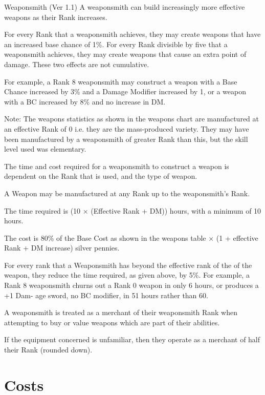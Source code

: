 \begin{Chapter}{Weaponsmith (Ver 1.1)}
A weaponsmith can build increasingly more effective weapons as their
Rank increases.

For every Rank that a weaponsmith achieves, they may create weapons
that have an increased base chance of 1\%.  For every Rank divisible
by five that a weaponsmith achieves, they may create weapons that
cause an extra point of damage.  These two effects are not cumulative.

For example, a Rank 8 weaponsmith may construct a weapon with a Base
Chance increased by 3\% and a Damage Modifier increased by 1, or a
weapon with a BC increased by 8\% and no increase in DM.

Note: The weapons statistics as shown in the weapons chart are
manufactured at an effective Rank of 0 i.e. they are the mass-produced
variety.  They may have been manufactured by a weaponsmith of greater
Rank than this, but the skill level used was elementary.

The time and cost required for a weaponsmith to construct a weapon is
dependent on the Rank that is used, and the type of weapon.

A Weapon may be manufactured at any Rank up to the weaponsmith’s Rank.

\begin{Enumerate}

\item The time required is (10 × (Effective Rank + DM)) hours, with a
  minimum of 10 hours.

\item The cost is 80\% of the Base Cost as shown in the weapons table
  × (1 + effective Rank + DM increase) silver pennies.

\item For every rank that a Weaponsmith has beyond the effective rank
  of the of the weapon, they reduce the time required, as given above,
  by 5\%.  For example, a Rank 8 weaponsmith churns out a Rank 0
  weapon in only 6 hours, or produces a +1 Dam- age sword, no BC
  modifier, in 51 hours rather than 60.

\end{Enumerate}

A weaponsmith is treated as a merchant of their weaponsmith Rank when
attempting to buy or value weapons which are part of their abilities.

If the equipment concerned is unfamiliar, then they operate as a
merchant of half their Rank (rounded down).

\section{Costs}


\end{Chapter}
